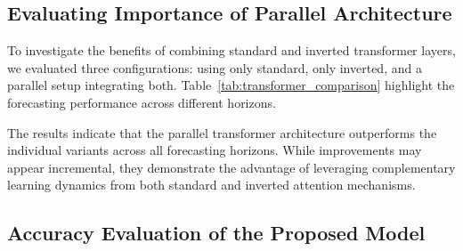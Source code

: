 \documentclass[12pt]{uomthesis}
\begin{document}
\subsection{Evaluating Importance of Parallel Architecture}

To investigate the benefits of combining standard and inverted transformer layers, we evaluated three configurations: using only standard, only inverted, and a parallel setup integrating both. Table~\ref{tab:transformer_comparison} highlight the forecasting performance across different horizons.

\begin{table}[ht]
\centering
\caption{Comparison of transformer architectures using Mean Squared Error (MSE) across different output sequence lengths.}
\label{tab:transformer_comparison}
\end{table}


The results indicate that the parallel transformer architecture outperforms the individual variants across all forecasting horizons. While improvements may appear incremental, they demonstrate the advantage of leveraging complementary learning dynamics from both standard and inverted attention mechanisms.

\subsection{Accuracy Evaluation of the Proposed Model}
\end{document}
